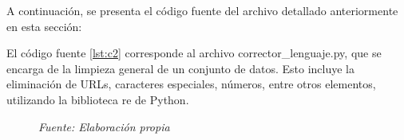 A continuación, se presenta el código fuente del  archivo detallado anteriormente en esta sección:

El código fuente \ref{lst:c2} corresponde al archivo corrector\_lenguaje.py, que se encarga de la limpieza general de un conjunto de datos. Esto incluye la eliminación de URLs, caracteres especiales, números, entre otros elementos, utilizando la biblioteca re de Python.



\vspace{-1.3em} %

\begin{figure}[h!]
	\centering %
	\textit{Fuente: Elaboración propia}
\end{figure}
